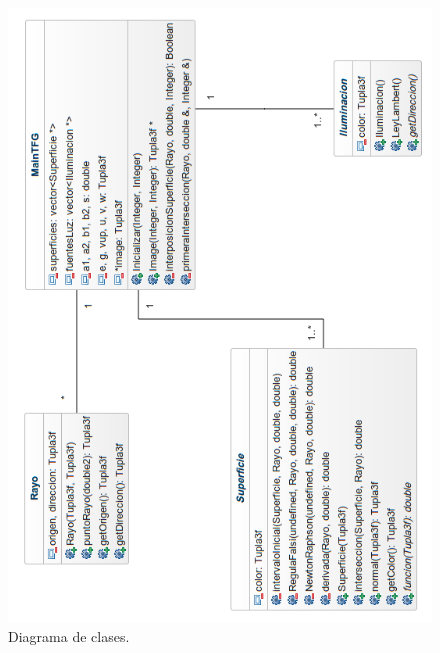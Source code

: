 \begin{figure}[h]
	\begin{center}
		\includegraphics[width=1.0\textwidth]{imagenes/diagrama-clases-completo.png}
	\end{center}
	\caption{Diagrama de clases.}
	\label{fig:etiq_33}
\end{figure}